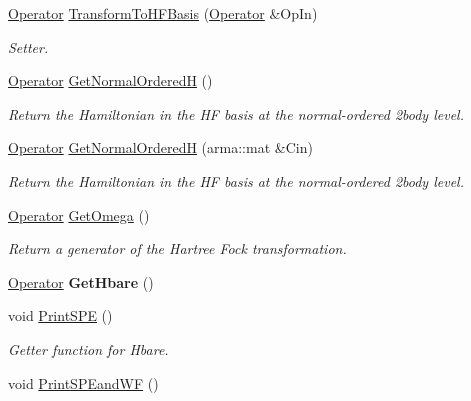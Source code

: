 \begin{DoxyCompactItemize}
\item 
\hyperlink{classOperator}{Operator} \hyperlink{classHartreeFock_a55914915cea16669e549025c244b62d0}{Transform\-To\-H\-F\-Basis} (\hyperlink{classOperator}{Operator} \&Op\-In)
\begin{DoxyCompactList}\small\item\em Setter. \end{DoxyCompactList}\item 
\hyperlink{classOperator}{Operator} \hyperlink{classHartreeFock_a17bdb52033e2f62bba72ea86bc196b37}{Get\-Normal\-Ordered\-H} ()
\begin{DoxyCompactList}\small\item\em Return the Hamiltonian in the H\-F basis at the normal-\/ordered 2body level. \end{DoxyCompactList}\item 
\hypertarget{classHartreeFock_ad7da4e35f14128c1c0becf204e15a4e1}{\hyperlink{classOperator}{Operator} \hyperlink{classHartreeFock_ad7da4e35f14128c1c0becf204e15a4e1}{Get\-Normal\-Ordered\-H} (arma\-::mat \&Cin)}\label{classHartreeFock_ad7da4e35f14128c1c0becf204e15a4e1}

\begin{DoxyCompactList}\small\item\em Return the Hamiltonian in the H\-F basis at the normal-\/ordered 2body level. \end{DoxyCompactList}\item 
\hyperlink{classOperator}{Operator} \hyperlink{classHartreeFock_a53011b381945ed5c61f50b209db5bf64}{Get\-Omega} ()
\begin{DoxyCompactList}\small\item\em Return a generator of the Hartree Fock transformation. \end{DoxyCompactList}\item 
\hypertarget{classHartreeFock_a7f2a07edc3ccaa0cf9bbc0faadfd9ddf}{\hyperlink{classOperator}{Operator} {\bfseries Get\-Hbare} ()}\label{classHartreeFock_a7f2a07edc3ccaa0cf9bbc0faadfd9ddf}

\item 
void \hyperlink{classHartreeFock_ab96b85eca26bf7c57430242201066932}{Print\-S\-P\-E} ()
\begin{DoxyCompactList}\small\item\em Getter function for Hbare. \end{DoxyCompactList}\item 
\hypertarget{classHartreeFock_a51d5163a8df635593edbeaa531aa5a34}{void \hyperlink{classHartreeFock_a51d5163a8df635593edbeaa531aa5a34}{Print\-S\-P\-Eand\-W\-F} ()}\label{classHartreeFock_a51d5163a8df635593edbeaa531aa5a34}


\end{DoxyCompactItemize}
